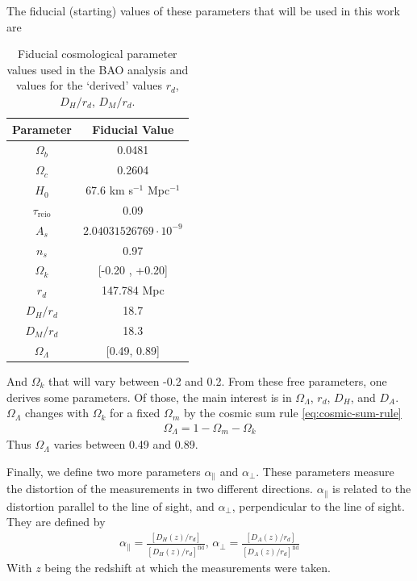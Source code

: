 The fiducial (starting) values of these parameters that will be used in this work are
\begin{table}[t]
\begin{center}
\begin{tabular}{|c|c|}
\hline
Parameter & Fiducial Value \\
\hline
$\Omega_b$ & 0.0481 \\
$\Omega_c$ & 0.2604 \\
$H_0$ & 67.6 km s$^{-1}$ Mpc$^{-1}$ \\
$\tau_{\text{reio}}$ & 0.09 \\
$A_s$ & $2.04031526769 \cdot 10^{-9}$ \\
$n_s$ & 0.97 \\
$\Omega_k$ & [-0.20 , +0.20]  \\
\hline
\hline
$r_d$ & 147.784 Mpc \\
$D_H/r_d$ & 18.7 \\
$D_M/r_d$ & 18.3 \\
$\Omega_\Lambda$ & [0.49, 0.89] \\
\hline
\end{tabular}
\end{center}
\caption{Fiducial cosmological parameter values used in the BAO analysis and values for the `derived' values $r_d$, $D_H / r_d$, $D_M /r_d$.}
\label{tab:fid-values}
\end{table}
And $\Omega _k$ that will vary between -0.2 and 0.2. From these free parameters, one derives some parameters. Of those, the main interest is in $\Omega_\Lambda$, $r_d$, $D_H$, and $D_A$. $\Omega_\Lambda$ changes with $\Omega_k$ for a fixed $\Omega_m$ by the cosmic sum rule \eqref{eq:cosmic-sum-rule}
\begin{align}
	\Omega_\Lambda =  1 - \Omega_m - \Omega_k
\end{align}
Thus $\Omega_\Lambda$ varies between 0.49 and 0.89.

Finally, we define two more parameters $\alpha_\parallel$ and $\alpha_\perp$. These parameters measure the distortion of the measurements in two different directions. $\alpha_\parallel$ is related to the distortion parallel to the line of sight, and  $\alpha_\perp$, perpendicular to the line of sight. They are defined by 
\begin{align}
	\alpha_\parallel = \frac{\left[ D_H(z) /r_d \right] }{\left[ D_H(z)/r_d \right]^{\text{fid}} }, \, \alpha_\perp = \frac{\left[ D_A(z) /r_d \right] }{\left[ D_A(z)/r_d \right]^{\text{fid}} }
	\label{eq:alphas-def}
\end{align}
With $z$ being the redshift at which the measurements were taken.
